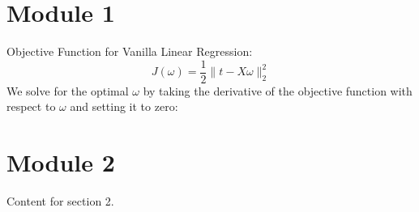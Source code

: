 \documentclass[10pt]{article}
\begin{document}
\begin{multicols}{2}

\section*{Module 1}
Objective Function for Vanilla Linear Regression:
\begin{equation}
    J(\omega) = \frac{1}{2} \lVert{t - X\omega} \rVert^{2}_{2}
\end{equation}
We solve for the optimal $\omega$ by taking the derivative of the objective function with respect to $\omega$ and setting it to zero:

\section*{Module 2}
Content for section 2.


\end{multicols}
\end{document}

